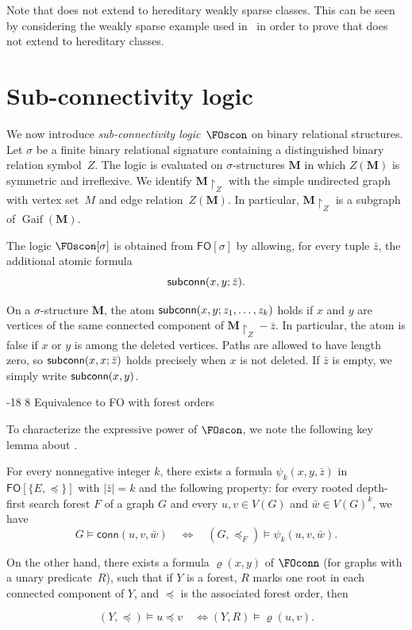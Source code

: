\documentclass[1p,number,11pt]{elsarticle}
\makeatletter
\renewcommand\subsection{\@startsection{subsection}{2}{\z@}%
  {-18\p@ \@plus -4\p@ \@minus -4\p@}%
  {8\p@ \@plus 4\p@ \@minus 4\p@}%
  {\normalfont\normalsize\bfseries}}
\newcommand{\scon}{\hbox{\sf subconn}}
\newcommand{\Gaif}{\operatorname{Gaif}}
\theoremstyle{plain}
\newcommand{\conn}{\mathsf{conn}}
\newcommand{\MZ}{\mathbf M\!\upharpoonright_Z}
\renewcommand{\FO}{\ensuremath{\mathsf{FO}}}
\makeatother
\begin{document}
Note that  does not extend to hereditary
weakly sparse classes. This can be seen by considering the weakly sparse example
used in~\cite{bonnet2022twin} in order to prove that  does not
extend to hereditary classes.

\section{Sub-connectivity logic}\label{sec:subconn-logic}

We now introduce \emph{sub-connectivity logic}~$\FOscon$ on binary relational
structures. Let $\sigma$ be a finite binary relational signature containing a
distinguished binary relation symbol~$Z$. The logic is evaluated on
$\sigma$-structures $\mathbf M$ in which $Z(\mathbf M)$ is symmetric and
irreflexive. We identify $\MZ$ with the simple undirected
graph with vertex set~$M$ and edge relation~$Z(\mathbf M)$. In particular,
$\MZ$ is a subgraph of $\Gaif(\mathbf M)$.

The logic $\FOscon[\sigma]$ is obtained from $\FO[\sigma]$ by allowing, for
every tuple $\bar z$, the additional atomic formula
\[
   \scon(x,y;\bar z).
\]

On a $\sigma$-structure $\mathbf M$, the atom
$\scon(x,y;z_1,\ldots,z_k)$ holds if $x$ and $y$ are vertices of the same
connected component of $\mathbf M\!\upharpoonright_Z-\bar z$. In particular,
the atom is false if $x$ or $y$ is among the deleted vertices. Paths are
allowed to have length zero, so $\scon(x,x;\bar z)$ holds precisely when $x$
is not deleted. If $\bar z$ is empty, we simply write $\scon(x,y)$.


\subsection{Equivalence to FO with forest orders}\label{sec:FOFO}

To characterize the expressive power of $\FOscon$, we note the following key lemma about \FOconn. 

\begin{lemma}
\label{lem:con=FO}
    For every nonnegative integer $k$,
    there exists a formula $\psi_k(x,y,\bar z)$ in $\FO[\{E,\preceq\}]$ with $|\bar z|=k$ and the following property:
    for every rooted depth-first search forest $F$ of a graph $G$ and every $u,v\in V(G)$ and $\bar w\in V(G)^k$, we have
    \[
    G\models \conn(u,v,\bar w)\quad\iff\quad (G,\preceq_F)\models \psi_k(u,v,\bar w).
    \]

     On the other hand,
     there exists a formula $\varrho(x,y)$ of $\FOconn$ (for graphs with a unary predicate~$R$),  such that if $Y$ is a forest, $R$ marks one root in each connected component of $Y$, and $\preceq$ is the associated forest order, then
     
\[
(Y,\preceq)\models u\preceq v\quad\iff (Y,R)\models \varrho(u,v).
\]
\end{lemma}
\end{document}
